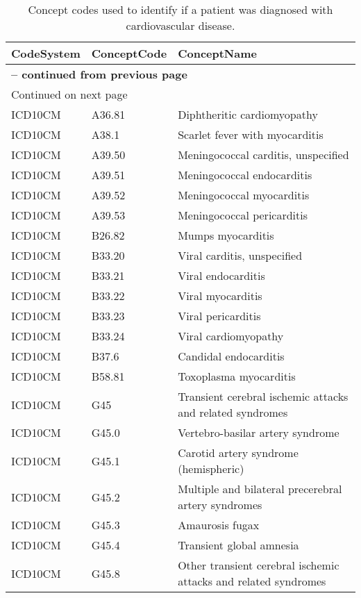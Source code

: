 \begin{longtable}{p{}p{}p{}}
\caption{Concept codes used to identify if a patient was diagnosed with cardiovascular disease.} \\ 
 CodeSystem & ConceptCode & ConceptName \\ 
  \hline 
\endfirsthead 
\multicolumn{3}{p{\textwidth}}{{ \bfseries \tablename \thetable{} -- continued from previous page}} \ 
\hline CodeSystem & ConceptCode & ConceptName \\ \hline 
\endhead 
\hline \multicolumn{3}{p{\textwidth}}{{Continued on next page}} \\ \hline 
\endfoot 
\hline 
\endlastfoot 
 \hline
ICD10CM & A36.81 & Diphtheritic cardiomyopathy \\ 
  ICD10CM & A38.1 & Scarlet fever with myocarditis \\ 
  ICD10CM & A39.50 & Meningococcal carditis, unspecified \\ 
  ICD10CM & A39.51 & Meningococcal endocarditis \\ 
  ICD10CM & A39.52 & Meningococcal myocarditis \\ 
  ICD10CM & A39.53 & Meningococcal pericarditis \\ 
  ICD10CM & B26.82 & Mumps myocarditis \\ 
  ICD10CM & B33.20 & Viral carditis, unspecified \\ 
  ICD10CM & B33.21 & Viral endocarditis \\ 
  ICD10CM & B33.22 & Viral myocarditis \\ 
  ICD10CM & B33.23 & Viral pericarditis \\ 
  ICD10CM & B33.24 & Viral cardiomyopathy \\ 
  ICD10CM & B37.6 & Candidal endocarditis \\ 
  ICD10CM & B58.81 & Toxoplasma myocarditis \\ 
  ICD10CM & G45 & Transient cerebral ischemic attacks and related syndromes \\ 
  ICD10CM & G45.0 & Vertebro-basilar artery syndrome \\ 
  ICD10CM & G45.1 & Carotid artery syndrome (hemispheric) \\ 
  ICD10CM & G45.2 & Multiple and bilateral precerebral artery syndromes \\ 
  ICD10CM & G45.3 & Amaurosis fugax \\ 
  ICD10CM & G45.4 & Transient global amnesia \\ 
  ICD10CM & G45.8 & Other transient cerebral ischemic attacks and related syndromes \\ 

\end{longtable}
